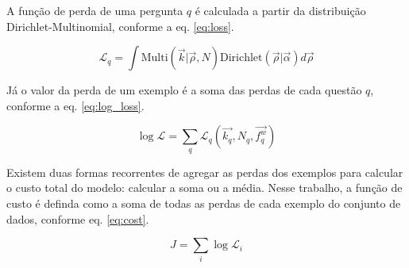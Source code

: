 

A função de perda de uma pergunta $q$ é calculada a partir da distribuição Dirichlet-Multinomial, conforme a eq. \eqref{eq:loss}.

\begin{equation}\label{eq:loss}
  \mathcal{L}_q = \int\text{Multi}(\vec{k}|\vec{\rho}, N) \text{Dirichlet}(\vec{\rho}|\vec{\alpha})d\vec{\rho}
\end{equation}

Já o valor da perda de um exemplo é a soma das perdas de cada questão $q$, conforme a eq. \eqref{eq:log_loss}.

\begin{equation}\label{eq:log_loss}
  \log \mathcal{L} = \sum_q \mathcal{L}_q(\vec{k_q}, N_q, \vec{f_q^w})
\end{equation}

Existem duas formas recorrentes de agregar as perdas dos exemplos para calcular o custo total do modelo: calcular a soma  ou a média. Nesse trabalho, a função de custo é definda como a soma de todas as perdas de cada exemplo do conjunto de dados, conforme eq. \eqref{eq:cost}.

\begin{equation}\label{eq:cost}
  J = \sum_i \log \mathcal{L}_i
\end{equation}




